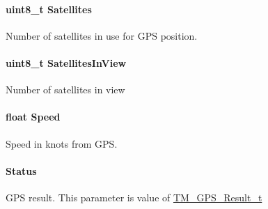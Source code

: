 \paragraph[{Satellites}]{\setlength{\rightskip}{0pt plus 5cm}uint8\+\_\+t Satellites}\label{struct_t_m___g_p_s___data__t_a0f88ecbf6fdf3e37c7f68680f6f88a40}
Number of satellites in use for G\+P\+S position. \hypertarget{struct_t_m___g_p_s___data__t_aa39923999b8128954eea86cc60f77dd9}{}
\paragraph[{Satellites\+In\+View}]{\setlength{\rightskip}{0pt plus 5cm}uint8\+\_\+t Satellites\+In\+View}\label{struct_t_m___g_p_s___data__t_aa39923999b8128954eea86cc60f77dd9}
Number of satellites in view \hypertarget{struct_t_m___g_p_s___data__t_a61efabcca15cccefe7d85ea6da6af5e3}{}
\paragraph[{Speed}]{\setlength{\rightskip}{0pt plus 5cm}float Speed}\label{struct_t_m___g_p_s___data__t_a61efabcca15cccefe7d85ea6da6af5e3}
Speed in knots from G\+P\+S. \hypertarget{struct_t_m___g_p_s___data__t_a605069be4b6e2a728b2528036f127f22}{}
\paragraph[{Status}]{ Status}\label{struct_t_m___g_p_s___data__t_a605069be4b6e2a728b2528036f127f22}
G\+P\+S result. This parameter is value of \hyperlink{group___t_m___g_p_s___typedefs_gaf3a9184315a145cb8288691c9c529427}{T\+M\+\_\+\+G\+P\+S\+\_\+\+Result\+\_\+t} \hypertarget{struct_t_m___g_p_s___data__t_a57a7872a3ef75ec2fdb0178b6250ccfc}{}

